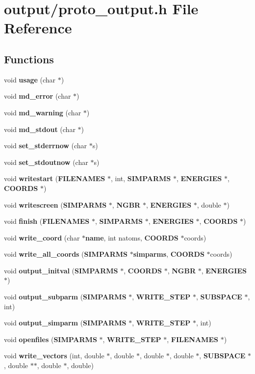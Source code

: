 \section{output/proto\_\-output.h File Reference}
\label{proto__output_8h}
\subsection*{Functions}
\begin{CompactItemize}
\item 
void {\bf usage} (char $\ast$)
\item 
void {\bf md\_\-error} (char $\ast$)
\item 
void {\bf md\_\-warning} (char $\ast$)
\item 
void {\bf md\_\-stdout} (char $\ast$)
\item 
void {\bf set\_\-stderrnow} (char $\ast$s)
\item 
void {\bf set\_\-stdoutnow} (char $\ast$s)
\item 
void {\bf writestart} ({\bf FILENAMES} $\ast$, int, {\bf SIMPARMS} $\ast$, {\bf ENERGIES} $\ast$, {\bf COORDS} $\ast$)
\item 
void {\bf writescreen} ({\bf SIMPARMS} $\ast$, {\bf NGBR} $\ast$, {\bf ENERGIES} $\ast$, double $\ast$)
\item 
void {\bf finish} ({\bf FILENAMES} $\ast$, {\bf SIMPARMS} $\ast$, {\bf ENERGIES} $\ast$, {\bf COORDS} $\ast$)
\item 
void {\bf write\_\-coord} (char $\ast${\bf name}, int natoms, {\bf COORDS} $\ast$coords)
\item 
void {\bf write\_\-all\_\-coords} ({\bf SIMPARMS} $\ast${\bf simparms}, {\bf COORDS} $\ast$coords)
\item 
void {\bf output\_\-initval} ({\bf SIMPARMS} $\ast$, {\bf COORDS} $\ast$, {\bf NGBR} $\ast$, {\bf ENERGIES} $\ast$)
\item 
void {\bf output\_\-subparm} ({\bf SIMPARMS} $\ast$, {\bf WRITE\_\-STEP} $\ast$, {\bf SUBSPACE} $\ast$, int)
\item 
void {\bf output\_\-simparm} ({\bf SIMPARMS} $\ast$, {\bf WRITE\_\-STEP} $\ast$, int)
\item 
void {\bf openfiles} ({\bf SIMPARMS} $\ast$, {\bf WRITE\_\-STEP} $\ast$, {\bf FILENAMES} $\ast$)
\item 
void {\bf write\_\-vectors} (int, double $\ast$, double $\ast$, double $\ast$, double $\ast$, {\bf SUBSPACE} $\ast$, double $\ast$$\ast$, double $\ast$, double)
$$
\end{CompactItemize}
